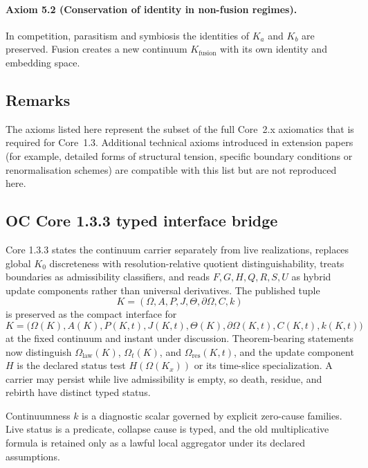 \paragraph{Axiom 5.2 (Conservation of identity in non-fusion regimes).}
In competition, parasitism and symbiosis the identities of \(K_a\) and \(K_b\)
are preserved.  Fusion creates a new continuum \(K_{\mathrm{fusion}}\) with its
own identity and embedding space.

\subsection{Remarks}

The axioms listed here represent the subset of the full Core~2.x axiomatics
that is required for Core~1.3. Additional technical axioms introduced in
extension papers (for example, detailed forms of structural tension, specific
boundary conditions or renormalisation schemes) are compatible with this list
but are not reproduced here.


\subsection{OC Core 1.3.3 typed interface bridge}
\label{sec:oc133-axioms-scientific-closure-bridge}

Core 1.3.3 states the continuum carrier separately from live realizations,
replaces global \(K_0\) discreteness with resolution-relative quotient
distinguishability, treats boundaries as admissibility classifiers, and reads
\(F,G,H,Q,R,S,U\) as hybrid update components rather than universal
derivatives.  The published tuple
\[
K=(\Omega,A,P,J,\Theta,\partial\Omega,C,k)
\]
is preserved as the compact interface for
\[
K=\big(\Omega(K),A(K),P(K,t),J(K,t),\Theta(K),
       \partial\Omega(K,t),C(K,t),k(K,t)\big)
\]
at the fixed continuum and instant under discussion.  Theorem-bearing
statements now distinguish \(\Omega_{\mathrm{law}}(K)\), \(\Omega_t(K)\), and
\(\Omega_{\mathrm{res}}(K,t)\), and the update component \(H\) is the declared
status test \(H(\Omega(K_x))\) or its time-slice specialization.  A carrier may
persist while live admissibility is empty, so death, residue, and rebirth have
distinct typed status.

Continuumness \(k\) is a diagnostic scalar governed by explicit zero-cause
families.  Live status is a predicate, collapse cause is typed, and the old
multiplicative formula is retained only as a lawful local aggregator under its
declared assumptions.
